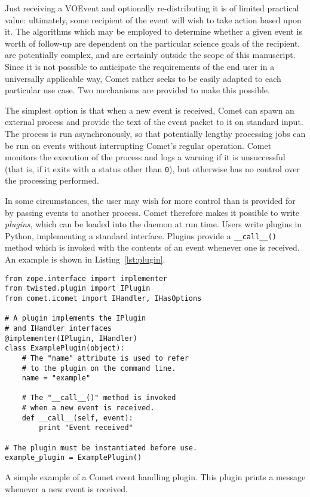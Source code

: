 \documentclass[5p,authoryear]{elsarticle}
\begin{document}
Just receiving a VOEvent and optionally re-distributing it is of limited
practical value: ultimately, some recipient of the event will wish to take
action based upon it. The algorithms which may be employed to determine
whether a given event is worth of follow-up are dependent on the particular
science goals of the recipient, are potentially complex, and are certainly
outside the scope of this manuscript. Since it is not possible to anticipate
the requirements of the end user in a universally applicable way, Comet rather
seeks to be easily adapted to each particular use case. Two mechanisms are
provided to make this possible.

The simplest option is that when a new event is received, Comet can spawn an
external process and provide the text of the event packet to it on standard
input.  The process is run asynchronously, so that potentially lengthy
processing jobs can be run on events without interrupting Comet's regular
operation.  Comet monitors the execution of the process and logs a warning if
it is unsuccessful (that is, if it exits with a status other than \texttt{0}),
but otherwise has no control over the processing performed.

In some circumstances, the user may wish for more control than is provided for
by passing events to another process. Comet therefore makes it possible to
write \textit{plugins}, which can be loaded into the daemon at run time.
Users write plugins in Python, implementing a standard interface. Plugins
provide a \texttt{\_\_call\_\_()} method which is invoked with the contents of
an event whenever one is received. An example is shown in
Listing~\ref{lst:plugin}.

\begin{listing}
\begin{verbatim}
from zope.interface import implementer
from twisted.plugin import IPlugin
from comet.icomet import IHandler, IHasOptions

# A plugin implements the IPlugin
# and IHandler interfaces
@implementer(IPlugin, IHandler)
class ExamplePlugin(object):
    # The "name" attribute is used to refer
    # to the plugin on the command line.
    name = "example"

    # The "__call__()" method is invoked
    # when a new event is received.
    def __call__(self, event):
        print "Event received"

# The plugin must be instantiated before use.
example_plugin = ExamplePlugin()
\end{verbatim}
\caption{A simple example of a Comet event handling plugin. This plugin prints
a message whenever a new event is received.}
\label{lst:plugin}
\end{listing}
\end{document}
